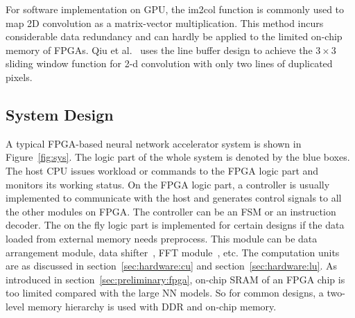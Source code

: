 For software implementation on GPU, the im2col function is commonly used to map 2D convolution as a matrix-vector multiplication. This method incurs considerable data redundancy and can hardly be applied to the limited on-chip memory of FPGAs. Qiu et al.~\cite{qiu2016going} uses the line buffer design to achieve the $3\times 3$ sliding window function for 2-d convolution with only two lines of duplicated pixels. 

\subsection{System Design}\label{sec:hardware:sys}

A typical FPGA-based neural network accelerator system is shown in Figure~\ref{fig:sys}. The logic part of the whole system is denoted by the blue boxes. The host CPU issues workload or commands to the FPGA logic part and monitors its working status. On the FPGA logic part, a controller is usually implemented to communicate with the host and generates control signals to all the other modules on FPGA. The controller can be an FSM or an instruction decoder. The on the fly logic part is implemented for certain designs if the data loaded from external memory needs preprocess. This module can be data arrangement module, data shifter~\cite{qiu2016going}, FFT module~\cite{zhang2017frequency}, etc. The computation units are as discussed in section~\ref{sec:hardware:cu} and section~\ref{sec:hardware:lu}. As introduced in section~\ref{sec:preliminary:fpga}, on-chip SRAM of an FPGA chip is too limited compared with the large NN models. So for common designs, a two-level memory hierarchy is used with DDR and on-chip memory. 


